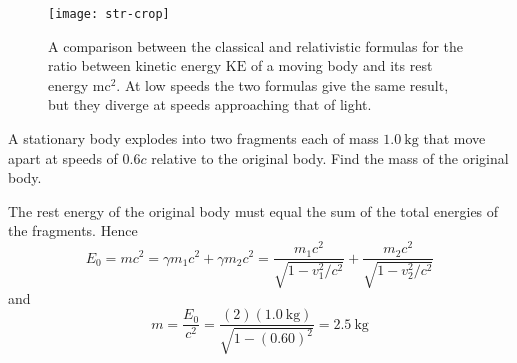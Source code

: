  \begin{figure}[H]
 	\centering
 	\texttt{[image: str-crop]}
 	\caption{ A comparison between the classical and relativistic formulas for the ratio between kinetic energy $\mathrm{KE}$ of a moving body and its rest energy $\mathrm{mc}^{2}$. At low speeds the two formulas give the same result, but they diverge at speeds approaching that of light.}
 	\label{}
 \end{figure}
\begin{exercise}
	A stationary body explodes into two fragments each of mass $1.0 \mathrm{~kg}$ that move apart at speeds of $0.6 c$ relative to the original body. Find the mass of the original body.
\end{exercise}
\begin{answer}
	The rest energy of the original body must equal the sum of the total energies of the fragments. Hence
	$$
	E_{0}=m c^{2}=\gamma m_{1} c^{2}+\gamma m_{2} c^{2}=\frac{m_{1} c^{2}}{\sqrt{1-v_{1}^{2} / c^{2}}}+\frac{m_{2} c^{2}}{\sqrt{1-v_{2}^{2} / c^{2}}}
	$$
	and
	$$
	m=\frac{E_{0}}{c^{2}}=\frac{(2)(1.0 \mathrm{~kg})}{\sqrt{1-(0.60)^{2}}}=2.5 \mathrm{~kg}
	$$
\end{answer}
